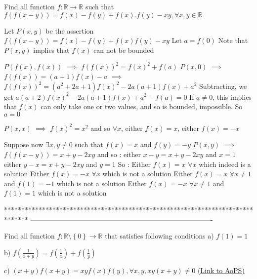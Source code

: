 \begin{solution}
	\begin{tcolorbox}Find all function $f : \mathbb{R} \to \mathbb{R}$ such that 
$f\left ( f\left ( x-y \right ) \right )=f ( x )-f(y)+f(x).f(y)-xy  ,\forall x,y\in \mathbb{R}$\end{tcolorbox}
Let $P(x,y)$ be the assertion $f(f(x-y))=f(x)-f(y)+f(x)f(y)-xy$
Let $a=f(0)$
Note that $P(x,y)$ implies that $f(x)$ can not be bounded

$P(f(x),f(x))$ $\implies$ $f(f(x))^2=f(x)^2+f(a)$
$P(x,0)$ $\implies$ $f(f(x))=(a+1)f(x)-a$ $\implies$ $f(f(x))^2=(a^2+2a+1)f(x)^2-2a(a+1)f(x)+a^2$
Subtracting, we get $a(a+2)f(x)^2-2a(a+1)f(x)+a^2-f(a)=0$
If $a\ne 0$, this implies that $f(x)$ can only take one or two values, and so is bounded, impossible. So $a=0$

$P(x,x)$ $\implies$ $f(x)^2=x^2$ and so $\forall x$, either $f(x)=x$, either $f(x)=-x$

Suppose now $\exists x,y\ne 0$ such that $f(x)=x$ and $f(y)=-y$
$P(x,y)$ $\implies$ $f(f(x-y))=x+y-2xy$ and so :
either $x-y=x+y-2xy$ and $x=1$
either $y-x=x+y-2xy$ and $y=1$
So :
Either $\boxed{f(x)=x}$ $\forall x$ which indeed is a solution
Either $f(x)=-x$ $\forall x$ which is not a solution
Either $f(x)=x$ $\forall x\ne 1$ and $f(1)=-1$ which is not a solution
Either $f(x)=-x$ $\forall x\ne 1$ and $f(1)=1$ which is not a solution
\end{solution}
*******************************************************************************
-------------------------------------------------------------------------------

\begin{problem}
	Find all function $f :\mathbb{R}\setminus \left \{ 0 \right \}  \to \mathbb{R}$ that satisfies following conditions
a) $ f(1)=1$

b)  $f\left ( \frac{1}{x+y} \right )=f\left ( \frac{1}{x} \right )+f\left ( \frac{1}{y} \right )$

c)  $\left ( x+y \right )f(x+y)=xyf(x)f(y),\forall x,y,xy(x+y)\neq 0$
	\flushright \href{https://artofproblemsolving.com/community/c6h618322}{(Link to AoPS)}
\end{problem}



